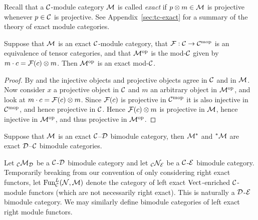 \documentclass{amsart}
\begin{document}
Recall that a $\mathcal C$-module category $\mathcal M$ is called {\em exact} if $p \otimes m \in \mathcal M$ is projective whenever $p \in \mathcal C$ is projective.  See Appendix~\ref{sec:tc-exact} for a summary of the theory of exact module categories.

\begin{lemma}
Suppose that $\mathcal M$ is an exact $\mathcal C$-module category, that $\mathcal F: \mathcal C \rightarrow \mathcal C^{\mathrm{mop}}$ is an equivalence of tensor categories, and that $\mathcal M^{\mathrm{op}}$ is the mod-$\mathcal C$ given by $m \cdot c = \mathcal F(c) \otimes m$.  Then $\mathcal M^{\mathrm{op}}$ is an exact mod-$\mathcal C$.
\end{lemma}
\begin{proof}
By \cite[Prop. 2.3]{MR2119143} and \cite[Corollary 3.6]{MR2119143} the injective objects and projective objects agree in $\mathcal C$ and in $\mathcal M$.  Now consider $x$ a projective object in $\mathcal C$ and $m$ an arbitrary object in $\mathcal M^{\mathrm{op}}$, and look at $m \cdot c = \mathcal F(c) \otimes m$.  Since $\mathcal F(c)$ is projective in $\mathcal C^{\mathrm{mop}}$ it is also injective in $\mathcal C^{\mathrm{mop}}$, and hence projective in $\mathcal C$.  Hence $\mathcal F(c) \otimes m$ is projective in $\mathcal M$, hence injective in $\mathcal M^{\mathrm{op}}$, and thus projective in $\mathcal M^{\mathrm{op}}$.
\end{proof}

\begin{corollary} \label{cor:adjoint-exactness}
Suppose that $\mathcal M$ is an exact $\mathcal C$--$\mathcal D$ bimodule category, then $\mathcal M^*$ and ${}^*\mathcal M$ are exact $\mathcal D$--$\mathcal C$ bimodule categories.
\end{corollary}


\begin{definition}
	Let ${}_{\mathcal C}\mathcal M_\mathcal D$ be a $\mathcal C$-$\mathcal D$ bimodule category and let ${}_{\mathcal C}\mathcal N_\mathcal E$ be a $\mathcal C$-$\mathcal E$ bimodule category. Temporarily breaking from our convention of only considering right exact functors, let	 $\operatorname{Fun}^L_{\mathcal C}(\mathcal N, \mathcal M)$ denote the category of left exact $\mathrm{Vect}$-enriched $\mathcal C$-module functors (which are not necessarily right exact). This is naturally a $\mathcal D$-$\mathcal E$ bimodule category. We may similarly define bimodule categories of left exact right module functors. 
\end{definition}
\end{document}
